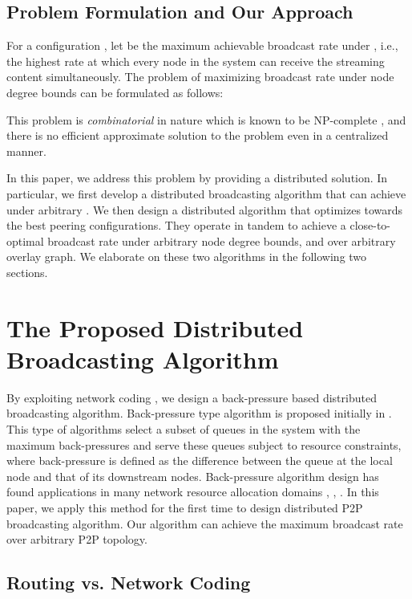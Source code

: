 \documentclass[10pt,conference]{IEEEtran}
\begin{document}
\subsection{Problem Formulation and Our Approach}

For a configuration , let 
be the maximum achievable broadcast rate under , i.e., the highest rate at which
every node in the system can receive the streaming content simultaneously. The problem of
maximizing broadcast rate under node degree bounds can be
formulated as follows:


This problem is \emph{combinatorial} in nature which is known to be NP-complete \cite{streaming_capacity.icdcs10},
and there is no efficient approximate solution to the problem even
in a centralized manner.

In this paper, we address this problem by providing a distributed
solution. In particular, we first develop a distributed broadcasting
algorithm that can achieve  under arbitrary .
We then design a distributed algorithm that optimizes towards
the best peering configurations. They operate in tandem to achieve
a close-to-optimal broadcast rate under arbitrary node degree bounds,
and over arbitrary overlay graph. We elaborate on these two algorithms
in the following two sections.

\section{The Proposed Distributed Broadcasting Algorithm}

\label{sec:streaming_rate}


By exploiting network coding \cite{all:NetCod:ACLY00}, we design a back-pressure based distributed broadcasting algorithm. Back-pressure type algorithm is proposed initially in \cite{Tassiulas92backpressure}. This type of algorithms select a subset of queues in the system with the maximum back-pressures and serve these queues subject to resource constraints, where back-pressure is defined as the difference between the queue at the local node and that of its downstream nodes. Back-pressure algorithm design has found applications in many network resource allocation domains \cite{all:Backpressure:MAW96}, \cite{all:Backpressure:ESP05}, \cite{all:Backpressure:NMR05}. In this paper, we apply this method for the first time to design distributed P2P broadcasting algorithm. Our algorithm can achieve the maximum broadcast rate over arbitrary P2P topology.


\subsection{Routing vs. Network Coding}\label{subsec:routing-vs-coding}
\end{document}
